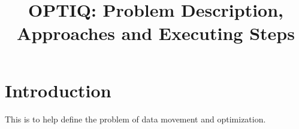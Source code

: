 \documentclass[letter]{article}
\title{OPTIQ: Problem Description, Approaches and Executing Steps}
\begin{document}
\maketitle



\section{Introduction}
This is to help define the problem of data movement and optimization.
\end{document}
